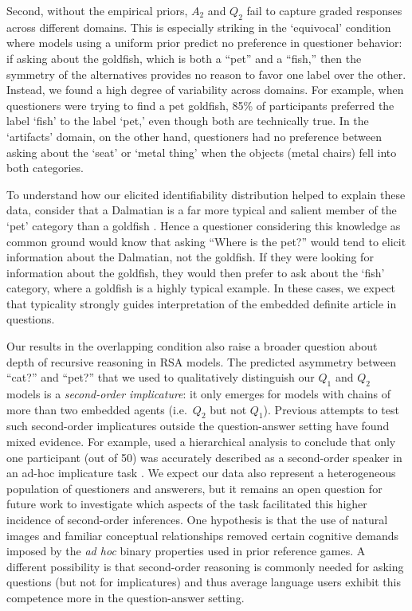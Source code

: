 \documentclass[11pt, floatsintext]{apa6}
\begin{document}
Second, without the empirical priors, $A_2$ and $Q_2$ fail to capture graded responses across different domains. 
This is especially striking in the `equivocal' condition where models using a uniform prior predict no preference in questioner behavior: if asking about the goldfish, which is both a ``pet'' and a ``fish,'' then the symmetry of the alternatives provides no reason to favor one label over the other. 
Instead, we found a high degree of variability across domains. 
For example, when questioners were trying to find a pet goldfish, 85\% of participants preferred the label `fish' to the label `pet,' even though both are technically true. 
In the `artifacts' domain, on the other hand, questioners had no preference between asking about the `seat' or `metal thing' when the objects (metal chairs) fell into both categories.

To understand how our elicited identifiability distribution helped to explain these data, consider that a Dalmatian is a far more typical and salient member of the `pet' category than a goldfish \cite{Rosch75}. 
Hence a questioner considering this knowledge as common ground would know that asking ``Where is the pet?'' would tend to elicit information about the Dalmatian, not the goldfish. 
If they were looking for information about the goldfish, they would then prefer to ask about the `fish' category, where a goldfish is a highly typical example. 
In these cases, we expect that typicality strongly guides interpretation of the embedded definite article in questions.

Our results in the overlapping condition also raise a broader question about depth of recursive reasoning in RSA models.
The predicted asymmetry between ``cat?'' and ``pet?'' that we used to qualitatively distinguish our $Q_1$ and $Q_2$ models is a \emph{second-order implicature}: it only emerges for models with chains of more than two embedded agents (i.e.~$Q_2$ but not $Q_1$).
Previous attempts to test such second-order implicatures outside the question-answer setting have found mixed evidence. 
For example,  used a hierarchical analysis to conclude that only one participant (out of 50) was accurately described as a second-order speaker in an ad-hoc implicature task \cite<see also>{frank2017rational}.
We expect our data also represent a heterogeneous population of questioners and answerers, but it remains an open question for future work to investigate which aspects of the task facilitated this higher incidence of second-order inferences.
One hypothesis is that the use of natural images and familiar conceptual relationships removed certain cognitive demands imposed by the \emph{ad hoc} binary properties used in prior reference games.
A different possibility is that second-order reasoning is commonly needed for asking questions (but not for implicatures) and thus average language users exhibit this competence more in the question-answer setting.
\end{document}
